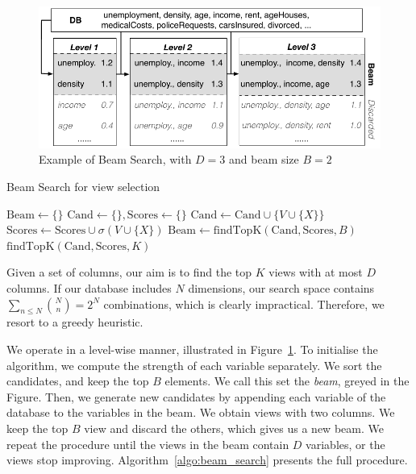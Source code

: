 \label{sec:base}
\begin{figure}[t!]
\centering
\includegraphics[width=\columnwidth]{images/beam-search}
\caption{Example of Beam Search, with $D=3$ and beam size $B=2$}
\label{pic:beam-search}
\end{figure}
\begin{algorithm}[t]
\caption{Beam Search for view selection}
\label{algo:beam_search}
\begin{algorithmic}
    \State $\text{Beam} \gets \{\}$
        \State $\text{Cand} \gets \{\}, \text{Scores} \gets \{\}$
            \State $\text{Cand} \gets \text{Cand} \cup \{V \cup \{X\} \}$
            \State $\text{Scores} \gets \text{Scores} \cup \sigma(V \cup \{X\}) $
            \EndFor
        \EndFor
        \State $\text{Beam} \gets \text{findTopK}(\text{Cand}, \text{Scores}, B)$
    \EndFor
    \State \Return $\text{findTopK}(\text{Cand}, \text{Scores}, K)$
    \EndFunction
\end{algorithmic}
\end{algorithm}
Given a set of columns, our aim is to find the top $K$ views with at most $D$
columns. If our database includes $N$ dimensions, our search space contains
$\sum_{n \leq N} \binom{N}{n} = 2^N$ combinations, which is clearly
impractical. Therefore, we resort to a  greedy heuristic.

We operate in a level-wise manner, illustrated in Figure~\ref{pic:beam-search}.
To initialise the algorithm, we compute the strength of each variable
separately. We sort the candidates, and keep the top $B$ elements. We call this
set the \emph{beam}, greyed in the Figure. Then, we  generate new candidates by
appending each variable of the database to the variables in the beam. We obtain
views with two columns.  We keep the top $B$ view and discard the others, which
gives us a new beam. We repeat the procedure until the views in the beam
contain $D$ variables, or the views stop improving.
Algorithm~\ref{algo:beam_search} presents the full procedure.


